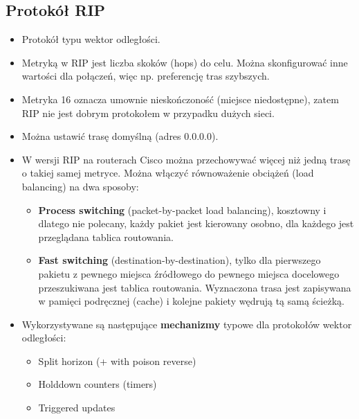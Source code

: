 \documentclass[a4paper]{article}
\begin{document}
\subsection{Protokół RIP}
\begin{itemize}
    \item Protokół typu wektor odległości.

    \item Metryką w RIP jest liczba skoków (hops) do celu. Można skonfigurować inne wartości dla połączeń, więc np. preferencję tras szybszych.

    \item Metryka 16 oznacza umownie nieskończoność (miejsce niedostępne), zatem RIP nie jest dobrym protokołem w przypadku dużych sieci.

    \item Można ustawić trasę domyślną (adres 0.0.0.0).

    \item W wersji RIP na routerach Cisco można przechowywać więcej niż jedną trasę o
    takiej samej metryce. Można włączyć równoważenie obciążeń (load balancing) na dwa
    sposoby:
    \begin{itemize}
        \item \textbf{Process switching} (packet-by-packet load balancing), kosztowny i dlatego nie polecany, każdy pakiet jest kierowany osobno, dla każdego jest przeglądana tablica routowania.
        \item \textbf{Fast switching} (destination-by-destination), tylko dla pierwszego pakietu z pewnego miejsca źródłowego do pewnego miejsca docelowego przeszukiwana jest tablica routowania. Wyznaczona trasa jest zapisywana w pamięci podręcznej (cache) i kolejne pakiety wędrują tą samą ścieżką.
    \end{itemize}

    \item Wykorzystywane są następujące \textbf{mechanizmy} typowe dla protokołów wektor odległości:
    \begin{itemize}
        \item Split horizon (+ with poison reverse)
        \item Holddown counters (timers)
        \item Triggered updates
    \end{itemize}


\end{itemize}
\end{document}

